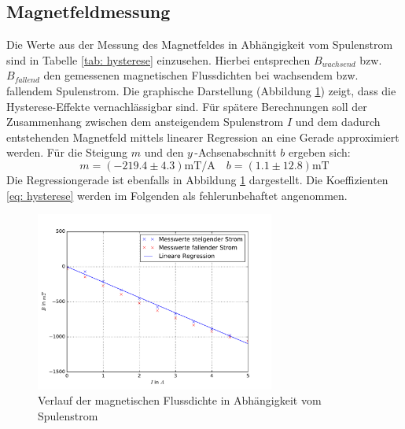 \subsection{Magnetfeldmessung}
Die Werte aus der Messung des Magnetfeldes in Abhängigkeit vom Spulenstrom sind in Tabelle \ref{tab: hysterese} einzusehen.
Hierbei entsprechen $B_{wachsend}$ bzw. $B_{fallend}$ den gemessenen magnetischen Flussdichten bei wachsendem
bzw. fallendem Spulenstrom.
Die graphische Darstellung (Abbildung \ref{fig: hysterese}) zeigt, dass die Hysterese-Effekte vernachlässigbar sind. Für
spätere Berechnungen soll der Zusammenhang zwischen dem ansteigendem Spulenstrom $I$ und dem dadurch entstehenden
Magnetfeld mittels linearer Regression an eine Gerade approximiert werden. Für die Steigung $m$ und den $y\,$-Achsenabschnitt $b$ ergeben sich:
\begin{equation}
  m = (-219.4 \pm 4.3) \si{\milli\tesla \per \ampere} \quad b =  (1.1 \pm 12.8) \si{\milli\tesla}
  \label{eq: hysterese}
\end{equation}
Die Regressiongerade ist ebenfalls in Abbildung \ref{fig: hysterese} dargestellt. Die Koeffizienten \eqref{eq: hysterese} werden im Folgenden
als fehlerunbehaftet angenommen.

\begin{figure}
  \centering
  \includegraphics[width=0.7\textwidth]{pics/hysterese.pdf}
  \caption{Verlauf der magnetischen Flussdichte in Abhängigkeit vom Spulenstrom}
  \label{fig: hysterese}
\end{figure}




